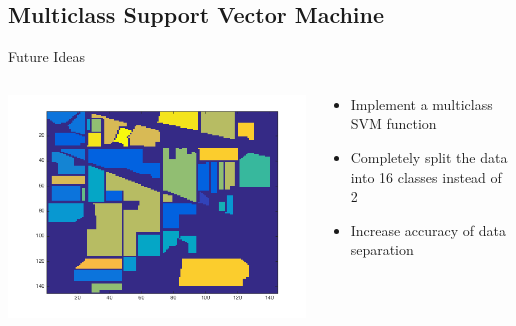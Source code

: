 \documentclass[11pt]{beamer}
\begin{document}
\subsection{Multiclass Support Vector Machine}
\begin{frame}{Future Ideas}
\begin{columns}[T]
\begin{column}{.48\textwidth}
\includegraphics[scale=.35]{groundtruth.png}
\end{column}
\hfill
\begin{column}{.48\textwidth}
\begin{itemize}
\item Implement a multiclass SVM function
\item Completely split the data into 16 classes instead of 2
\item Increase accuracy of data separation
\end{itemize}
\end{column}
\end{columns}
\end{frame}
\end{document}
